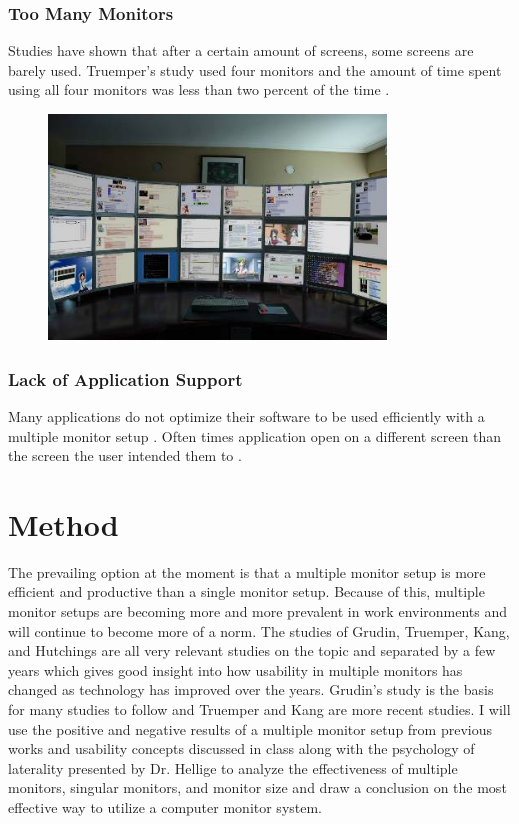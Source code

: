 \documentclass[a4paper]{article}
\begin{document}
\subsubsection{Too Many Monitors}
Studies have shown that after a certain amount of screens, some screens are barely used. Truemper's study used four monitors and the amount of time spent using all four monitors was less than two percent of the time \cite{Truemper}.
\begin{figure}[H]
\centering
\includegraphics[width=0.8\textwidth]{so-many.jpg}
\end{figure}

\subsubsection{Lack of Application Support}
Many applications do not optimize their software to be used efficiently with a multiple monitor setup \cite{Grudin}. Often times application open on a different screen than the screen the user intended them to \cite{Grudin}.


\section{Method}
The prevailing option at the moment is that a multiple monitor setup is more efficient and productive than a single monitor setup. Because of this, multiple monitor setups are becoming more and more prevalent in work environments and will continue to become more of a norm. The studies of Grudin, Truemper, Kang, and Hutchings are all very relevant studies on the topic and separated by a few years which gives good insight into how usability in multiple monitors has changed as technology has improved over the years. Grudin's study is the basis for many studies to follow and Truemper and Kang are more recent studies. I will use the positive and negative results of a multiple monitor setup from previous works and usability concepts discussed in class along with the psychology of laterality presented by Dr. Hellige to analyze the effectiveness of multiple monitors, singular monitors, and monitor size and draw a conclusion on the most effective way to utilize a computer monitor system.
\end{document}
